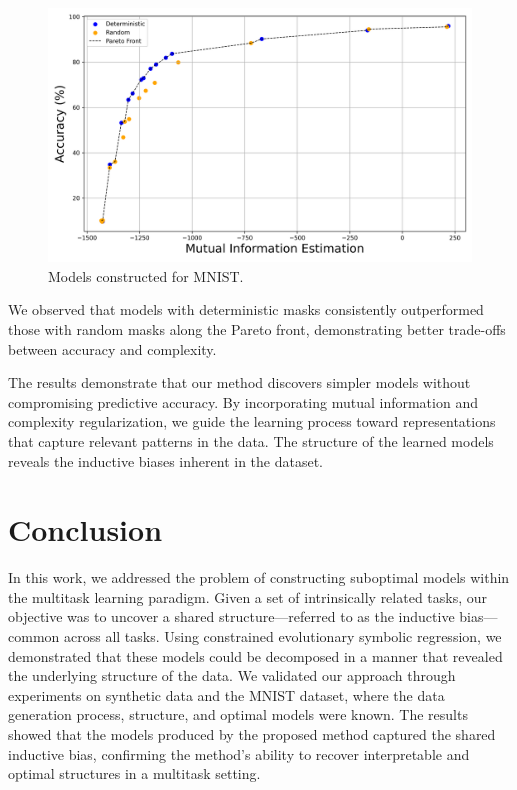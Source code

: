 \documentclass[14pt]{extarticle}
\begin{document}
        \begin{figure}[hbt!]
            \centering  
            \includegraphics[width=1\textwidth]{conv_pareto_front.png}
            \caption{Models constructed for MNIST.}
            \label{mnist_pareto_front}
        \end{figure}
        We observed that models with deterministic masks consistently outperformed those with random masks along the Pareto front, demonstrating better trade-offs between accuracy and complexity.
        

    The results demonstrate that our method discovers simpler models without compromising predictive accuracy. By incorporating mutual information and complexity regularization, we guide the learning process toward representations that capture relevant patterns in the data. The structure of the learned models reveals the inductive biases inherent in the dataset.  
\newpage
\section{Conclusion}
    In this work, we addressed the problem of constructing suboptimal models within the multitask learning paradigm. Given a set of intrinsically related tasks, our objective was to uncover a shared structure---referred to as the inductive bias---common across all tasks. Using constrained evolutionary symbolic regression, we demonstrated that these models could be decomposed in a manner that revealed the underlying structure of the data. We validated our approach through experiments on synthetic data and the MNIST dataset, where the data generation process, structure, and optimal models were known. The results showed that the models produced by the proposed method captured the shared inductive bias, confirming the method's ability to recover interpretable and optimal structures in a multitask setting.
    
\end{document}
